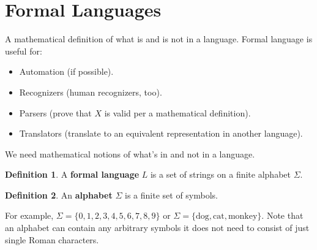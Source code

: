 \documentclass[]{article}
\theoremstyle{definition}
\newtheorem*{defn}{Definition}
\newcommand{\lecture}[1]{\marginpar{{\footnotesize $\leftarrow$ \underline{#1}}}}
\begin{document}
	\section{Formal Languages}
		A mathematical definition of what is and is not in a language. Formal language is useful for:
		\begin{itemize}
			\item Automation (if possible).
			\item Recognizers (human recognizers, too).
			\item Parsers (prove that $X$ is valid per a mathematical definition).
			\item Translators (translate to an equivalent representation in another language).
		\end{itemize}

		\lecture{February 4, 2013}
		We need mathematical notions of what's in and not in a language.

		\begin{defn}
		A \textbf{formal language} $L$ is a set of strings on a finite alphabet $\Sigma$.
		\end{defn}

		\begin{defn}
			An \textbf{alphabet} $\Sigma$ is a finite set of symbols.
		\end{defn}
		For example, $\Sigma = \{0, 1, 2, 3, 4, 5, 6, 7, 8, 9\}$ or $\Sigma = \{ \text{dog}, \text{cat}, \text{monkey} \}$. Note that an alphabet can contain any arbitrary symbols \textendash{} it does not need to consist of just single Roman characters.
\end{document}
